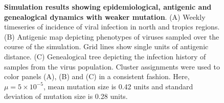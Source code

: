 \documentclass[11pt,oneside,letterpaper]{article}
\begin{document}
\vspace*{\fill}
\begin{figure}[H]
	\centering
	\caption{\textbf{Simulation results showing epidemiological, antigenic and genealogical dynamics with weaker mutation}. (A) Weekly timeseries of incidence of viral infection in north and tropics regions. (B) Antigenic map depicting phenotypes of viruses sampled over the course of the simulation.  Grid lines show single units of antigenic distance. (C) Genealogical tree depicting the infection history of samples from the virus population.  Cluster assignments were used to color panels (A), (B) and (C) in a consistent fashion.  Here, $\mu = 5 \times 10^{-5}$, mean mutation size is 0.42 units and standard deviation of mutation size is 0.28 units.}
	\label{h1n1_mut}
\end{figure}
\vspace*{\fill}

\pagebreak
\end{document}
